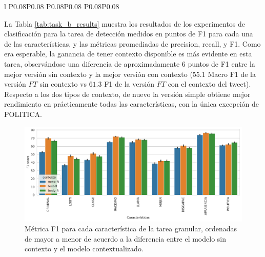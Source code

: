 \begin{table}
\begin{tabular}{l P{0.08\textwidth}P{0.08\textwidth} P{0.08\textwidth}P{0.08\textwidth}  P{0.08\textwidth}P{0.08\textwidth}}
        \bottomrule
        \end{tabular}
    \caption{Resultados de los experimentos de clasificación para la tarea \emph{granular} de detección de discurso de odio, expresados como la media de las distintas métricas sobre diez corridas independientes. Cada modelo es un BERT con tres posibles entradas: sólo el comentario (\emph{Sin contexto}), el tweet de la noticia a la cual responde el comentario (\emph{Tweet}), y el tweet más el cuerpo de la noticia (\emph{Tweet + Cuerpo}). Para cada una de estas posibilidades usamos dos versiones: una sobre BETO($\neg$FT) y otra sobre BETO ajustado al dominio (FT) de acuerdo a lo descripto en la Sección \ref{sec:contextualized_classifiers}}
    \label{tab:task_b_results}
\end{table}



La Tabla \ref{tab:task_b_results} muestra los resultados de los experimentos de clasificación para la tarea de detección  medidos en puntos de F1 para cada una de las características, y las métricas promediadas de precision, recall, y F1. Como era esperable, la ganancia de tener contexto disponible es más evidente en esta tarea, observándose una diferencia de aproximadamente 6 puntos de F1 entre la mejor versión sin contexto y la mejor versión con contexto ($55.1$ Macro F1 de la versión $FT$ sin contexto vs $61.3$ F1 de la versión $FT$ con el contexto del tweet). Respecto a los dos tipos de contexto, de nuevo la versión simple obtiene mejor rendimiento en prácticamente todas las características, con la única excepción de POLITICA.


\begin{figure}[]
    \centering
    \includegraphics[width=\textwidth]{img/06/task_b_scores.pdf}
    \caption{Métrica F1 para cada característica de la tarea granular, ordenadas de mayor a menor de acuerdo a la diferencia entre el modelo sin contexto y el modelo contextualizado. }
    \label{fig:barplot_task_b_results}
\end{figure}

